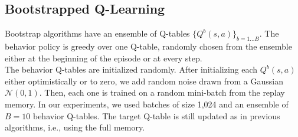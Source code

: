 \documentclass{article}
\newcommand{\gaussian}{\mathcal N}
\begin{document}
\clearpage

\subsection{Bootstrapped Q-Learning}
Bootstrap algorithms have an ensemble of Q-tables $\{Q^b(s,a)\}_{b = 1 \ldots B}$. The behavior policy is greedy over one Q-table, randomly chosen from the ensemble either at the beginning of the episode or at every step.
\\
The behavior Q-tables are initialized randomly. After initializing each $Q^b(s,a)$ either optimistically or to zero, we add random noise drawn from a Gaussian $\gaussian(0,1)$.
Then, each one is trained on a random mini-batch from the replay memory. In our experiments, we used batches of size 1,024 and an ensemble of $B = 10$ behavior Q-tables.
The target Q-table is still updated as in previous algorithms, i.e., using the full memory.
\end{document}
